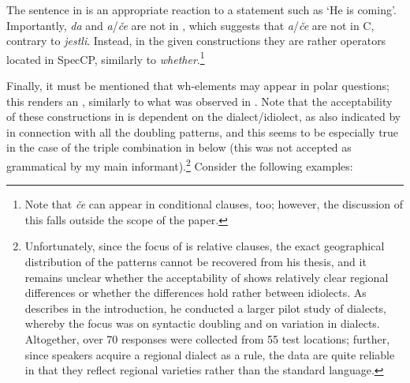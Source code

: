 \documentclass[output=paper,modfonts, hidelinks, newtxmath]{langscibook}
\begin{document}
\newpage
\noindent The sentence in  is an appropriate reaction to a statement such as `He is coming'. Importantly, \textit{da} and \textit{a}/\textit{če} are not in , which suggests that \textit{a}/\textit{če} are not in C, contrary to  \textit{jestli}. Instead, in the given constructions they are rather operators located in SpecCP, similarly to  \textit{whether}.\footnote{Note that \textit{če} can appear in conditional clauses, too; however, the discussion of this falls outside the scope of the  paper.}

Finally, it must be mentioned that wh-elements may appear in polar questions; this renders an , similarly to what was observed in . Note that the acceptability of these constructions in  is dependent on the dialect/idiolect, as also indicated by \citet{hladnik2010} in connection with all the doubling patterns, and this seems to be especially true in the case of the triple combination in  below (this was not accepted as grammatical by my main informant).\footnote{Unfortunately, since the focus of \citet{hladnik2010} is relative clauses, the exact geographical distribution of the  patterns cannot be recovered from his thesis, and it remains unclear whether the acceptability of  shows relatively clear regional differences or whether the differences hold rather between idiolects. As \citet[6--8]{hladnik2010} describes in the introduction, he conducted a larger pilot study of  dialects, whereby the focus was on syntactic doubling and on variation in dialects. Altogether, over 70 responses were collected from 55 test locations; further, since  speakers acquire a regional dialect as a rule, the data are quite reliable in that they reflect regional varieties rather than the standard language.} Consider the following examples:

\ea \label{polarecho}
	\z
\z
\end{document}
